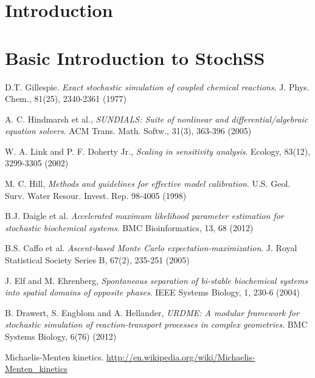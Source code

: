 \documentclass[report,openany]{memoir}
\title{\rightline{\HUGE StochSS: Stochastic Simulation Service}}
\date{}
\begin{document}
\maketitle

\tableofcontents

\chapter{Introduction}



\chapter{Basic Introduction to StochSS}
\label{chapter1}








\begin{thebibliography}{9}

  D.T. Gillespie.
  \textit{Exact stochastic simulation of coupled chemical reactions}.
  J. Phys. Chem., 81(25), 2340-2361 (1977)

  A. C. Hindmarsh et al.,
  \textit{SUNDIALS: Suite of nonlinear and differential/algebraic equation solvers}.
  ACM Trans. Math. Softw., 31(3), 363-396 (2005)
  
  W. A. Link and P. F. Doherty Jr.,
  \textit{Scaling in sensitivity analysis}.
  Ecology, 83(12), 3299-3305 (2002)
  
  M. C. Hill,
  \textit{Methods and guidelines for effective model calibration}. 
  U.S. Geol. Surv. Water Resour. Invest. Rep. 98-4005 (1998)
  
  B.J. Daigle et al.
  \textit{Accelerated maximum likelihood parameter estimation for stochastic biochemical systems}.
  BMC Bioinformatics, 13, 68 (2012)
  
  B.S. Caffo et al.
  \textit{Ascent-based Monte Carlo expectation-maximization}. 
  J. Royal Statistical Society Series B, 67(2), 235-251 (2005)
  
  J. Elf and M. Ehrenberg,
  \textit{Spontaneous separation of bi-stable biochemical systems into spatial domains of opposite phases}. IEEE Systems Biology, 1, 230-6 (2004)
  
 B. Drawert, S. Engblom and A. Hellander, 
 \textit{URDME: {A} modular framework for stochastic simulation
of reaction-transport processes in complex geometries}. BMC Systems Biology, 6(76) (2012)
  
  Michaelis-Menten kinetics. 
  \url{http://en.wikipedia.org/wiki/Michaelis-Menten_kinetics}
  
\end{thebibliography}
\end{document}

